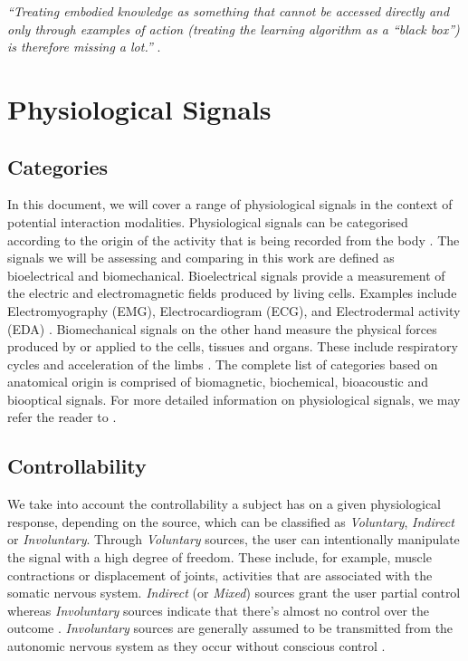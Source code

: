 \textit{``Treating embodied knowledge as something that cannot be accessed directly and only through examples of action (treating the learning algorithm as a “black box”) is therefore missing a lot.''} \citeauthor{gillies_understanding_2019} \cite{gillies_understanding_2019}.

\section{Physiological Signals}

\subsection*{Categories}
\label{subsec:catagories}

In this document, we will cover a range of physiological signals in the context of potential interaction modalities. Physiological signals can be categorised according to the origin of the activity that is being recorded from the body \cite{enderle_introduction_2012}. The signals we will be assessing and comparing in this work are defined as bioelectrical and biomechanical. Bioelectrical signals provide a measurement of the electric and electromagnetic fields produced by living cells. Examples include Electromyography (EMG), Electrocardiogram (ECG), and Electrodermal activity (EDA) \cite{malmivuo_bioelectromagnetismprinciples_1995}. Biomechanical signals on the other hand measure the physical forces produced by or applied to the cells, tissues and organs. These include respiratory cycles and acceleration of the limbs \cite{guerreiro_bitalino_2013, pacelli_sensing_2006}. The complete list of categories based on anatomical origin is comprised of biomagnetic, biochemical, bioacoustic and biooptical signals. For more detailed information on physiological signals, we may refer the reader to \cite{webb_principles_2018}.

\subsection*{Controllability}

We take into account the controllability a subject has on a given physiological response, depending on the source, which can be classified as \textit{Voluntary}, \textit{Indirect} or \textit{Involuntary}. Through \textit{Voluntary} sources, the user can intentionally manipulate the signal with a high degree of freedom. These include, for example, muscle contractions or displacement of joints, activities that are associated with the somatic nervous system. \textit{Indirect} (or \textit{Mixed}) sources grant the user partial control whereas \textit{Involuntary} sources indicate that there's almost no control over the outcome \cite{da_silva_biosignal_2017}. \textit{Involuntary} sources are generally assumed to be transmitted from the autonomic nervous system as they occur without conscious control \cite{lenman_human_1975}.

